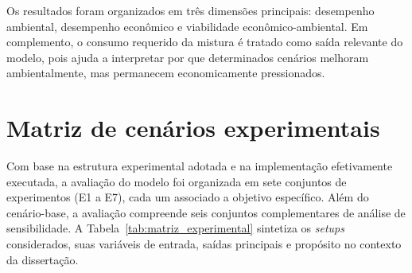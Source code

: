 Os resultados foram organizados em três dimensões principais: desempenho ambiental, desempenho econômico e viabilidade econômico-ambiental. Em complemento, o consumo requerido da mistura é tratado como saída relevante do modelo, pois ajuda a interpretar por que determinados cenários melhoram ambientalmente, mas permanecem economicamente pressionados.

\section{Matriz de cenários experimentais}

Com base na estrutura experimental adotada e na implementação efetivamente executada, a avaliação do modelo foi organizada em sete conjuntos de experimentos (E1 a E7), cada um associado a objetivo específico. Além do cenário-base, a avaliação compreende seis conjuntos complementares de análise de sensibilidade. A Tabela~\ref{tab:matriz_experimental} sintetiza os \emph{setups} considerados, suas variáveis de entrada, saídas principais e propósito no contexto da dissertação.

